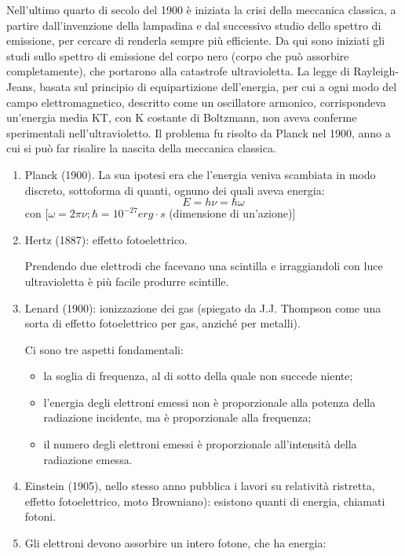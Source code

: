 Nell'ultimo quarto di secolo del 1900 è iniziata la crisi della meccanica
classica, a partire dall'invenzione della lampadina e dal successivo
studio dello spettro di emissione, per cercare di renderla sempre
più efficiente. Da qui sono iniziati gli studi sullo spettro di emissione
del corpo nero (corpo che può assorbire completamente), che portarono
alla catastrofe ultravioletta. La legge di Rayleigh-Jeans, basata sul
principio di equipartizione dell'energia, per cui a ogni modo del
campo elettromagnetico, descritto come un oscillatore armonico, corrispondeva
un'energia media KT, con K costante di Boltzmann, non aveva conferme
sperimentali nell'ultravioletto. Il problema fu risolto da Planck
nel 1900, anno a cui si può far risalire la nascita della meccanica
classica.
\begin{enumerate}
\item Planck (1900). La sua ipotesi era che l'energia veniva scambiata in
modo discreto, sottoforma di quanti, ognuno dei quali aveva energia:
\begin{equation}
E=h\nu=\hbar\omega
\end{equation}
con {[}$\omega=2\pi\nu;\hbar=10^{-27}erg\cdot s$ (dimensione di un'azione){]} 
\item Hertz (1887): effetto fotoelettrico.


Prendendo due elettrodi che facevano una scintilla e irraggiandoli
con luce ultravioletta è più facile produrre scintille. 

\item Lenard (1900): ionizzazione dei gas (spiegato da J.J. Thompson come
una sorta di effetto fotoelettrico per gas, anziché per metalli).


Ci sono tre aspetti fondamentali: 
\begin{itemize}
\item la soglia di frequenza, al di sotto della quale non succede niente; 
\item l'energia degli elettroni emessi non è proporzionale alla potenza
della radiazione incidente, ma è proporzionale alla frequenza; 
\item il numero degli elettroni emessi è proporzionale all'intensità della
radiazione emessa.
\end{itemize}
\item Einstein (1905), nello stesso anno pubblica i lavori su relatività
ristretta, effetto fotoelettrico, moto Browniano): esistono quanti
di energia, chiamati fotoni. 
\item Gli elettroni devono assorbire un intero fotone, che ha energia:


\end{enumerate}
